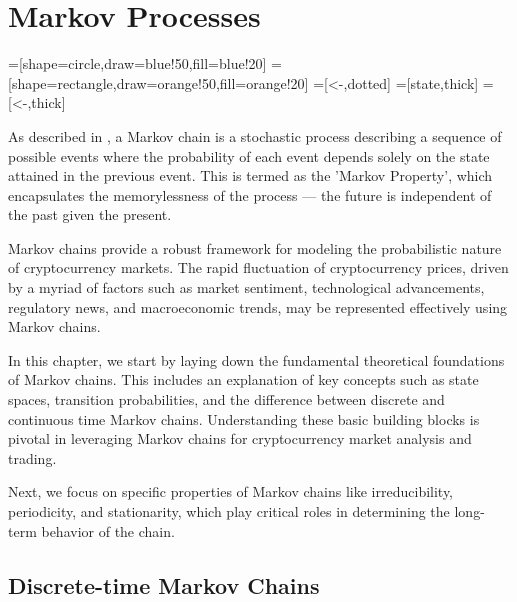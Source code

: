 \chapter{Markov Processes}  %

\ifpdf%
    \graphicspath{{Chapter1/Figs/Raster/}{Chapter1/Figs/PDF/}{Chapter1/Figs/}}
\else
    \graphicspath{{Chapter1/Figs/Vector/}{Chapter1/Figs/}}
\fi

=[shape=circle,draw=blue!50,fill=blue!20]
=[shape=rectangle,draw=orange!50,fill=orange!20]
=[<-,dotted]
=[state,thick]
=[<-,thick]

As described in \cite{Ross2014}, a Markov chain is a stochastic process describing a sequence of possible events where the probability of each event depends solely on the state attained in the previous event. This is termed as the 'Markov Property', which encapsulates the memorylessness of the process — the future is independent of the past given the present.

Markov chains provide a robust framework for modeling the probabilistic nature of cryptocurrency markets. The rapid fluctuation of cryptocurrency prices, driven by a myriad of factors such as market sentiment, technological advancements, regulatory news, and macroeconomic trends, may be represented effectively using Markov chains. \cite{Zhang2023}

In this chapter, we start by laying down the fundamental theoretical foundations of Markov chains. This includes an explanation of key concepts such as state spaces, transition probabilities, and the difference between discrete and continuous time Markov chains. Understanding these basic building blocks is pivotal in leveraging Markov chains for cryptocurrency market analysis and trading.

Next, we focus on specific properties of Markov chains like irreducibility, periodicity, and stationarity, which play critical roles in determining the long-term behavior of the chain.

\section{Discrete-time Markov Chains}

